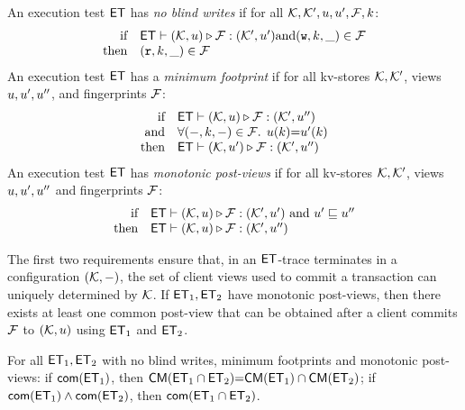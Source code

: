 \begin{definition}[$\ET$ properties]
\label{def:et_properties}
An execution test $\ET$ has \emph{no blind writes} if
for all $\mathcal{K}, \mathcal{K}', u, u', \mathcal{F}, k$:
\[
\begin{array}{@{} r @{\hspace{10pt}} l @{}}
\text{if} & \ET \vdash (\hh, \vi) \triangleright \opset: (\hh',\vi' ) 
\text{and} (\otW, \ke, \_) \in \opset \\
\text{then} & (\otR, \ke, \_) \in \opset
\end{array} 
\]
An execution test $\ET$ has a \emph{minimum footprint} if for all kv-stores $\mathcal{K}, \mathcal{K}'$,
views $u, u',u''$, and fingerprints $\mathcal{F}$: 
%
\[
\begin{array}{@{} r @{\hspace{10pt}} l @{}}
    \text{if} & \ET \vdash (\hh, \vi) \triangleright \opset : (\hh', \vi'')  \\
    \text{and} & \fora{(\stub, \ke, \stub) \in \f} \vi(\ke) {=} \vi'(\ke) \\
    \text{then} & \ET \vdash (\hh, \vi') \triangleright \opset : (\hh', \vi'')
\end{array} 
\]
%
An execution test $\ET$ has \emph{monotonic post-views} if 
for all kv-stores $\mathcal{K},\mathcal{K}'$, 
views $u, u',u''$ and fingerprints $\mathcal{F}$:
\[
\begin{array}{@{} r @{\hspace{10pt}} l @{}}
    \text{if} & \ET \vdash (\hh, \vi) \triangleright \opset : (\hh',\vi' )
    \text{ and } \vi' \sqsubseteq \vi''  \\
    \text{then} & \ET \vdash (\hh, \vi) \triangleright \opset : (\hh',\vi'')
\end{array} 
\]
\end{definition}
The first two requirements ensure that, in an $\ET$-trace 
terminates in a configuration $(\mathcal{K}, -)$, 
the set of client views used to commit a transaction can uniquely determined by $\mathcal{K}$. 
If $\mathsf{ET}_1, \mathsf{ET}_2$ have monotonic post-views, then there exists at least one common post-view 
that can be obtained after a client commits $\mathcal{F}$ to $(\mathcal{K}, u)$ using $\mathsf{ET}_1$ and $\mathsf{ET}_2$. 

\begin{theorem}[Compositionality]     
For all $\mathsf{ET}_1, \mathsf{ET}_2$ with no blind writes, minimum footprints and monotonic post-views: 
if $\mathsf{com}(\mathsf{ET}_1)$, 
then $\mathsf{CM}(\mathsf{ET}_1 \cap \mathsf{ET}_2) {=} \mathsf{CM}(\mathsf{ET}_1) \cap \mathsf{CM}(\mathsf{ET}_2)$;
if $\mathsf{com}(\mathsf{ET}_1) \land \mathsf{com}(\mathsf{ET}_2)$, then $\mathsf{com}(\mathsf{ET}_1 \cap \mathsf{ET}_2)$.
\end{theorem}

